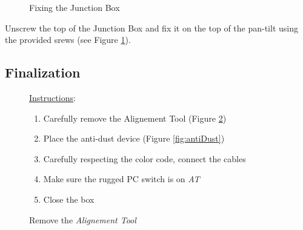 \vspace{20pt}
\begin{figure}[!ht]
  \centering
  \begin{minipage}[b]{0.49\textwidth}
	  \vspace{-10pt}
	  \caption{Fixing the Junction Box}
	\label{fig:fixJunction}
  \end{minipage}
\end{figure}

\noindent Unscrew the top of the Junction Box and fix it on the top of the pan-tilt
using the provided srews (see Figure \ref{fig:fixJunction}).


\clearpage
\subsection{Finalization}


\begin{figure}[!th]
	\centering
	\begin{minipage}[h]{0.6\textwidth}
		\vspace{-7cm}
		\underline{Instructions}:
		\begin{enumerate}
			\item Carefully remove the Alignement Tool (Figure \ref{fig:alignement})
			\item Place the anti-dust device (Figure \ref{fig:antiDust})
			\item Carefully respecting the color code, connect the cables
			\item Make sure the rugged PC switch is on \textit{AT}
			\item Close the box
		\end{enumerate}
	\end{minipage}
	\begin{minipage}[b]{0.3\textwidth}
		\vspace{-20pt}
		\caption{Remove the \textit{Alignement Tool}}
		\label{fig:alignement}
	\end{minipage}
\end{figure}


